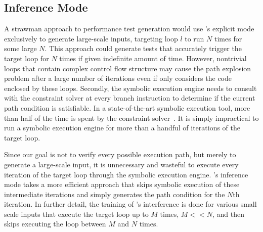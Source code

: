 \subsection{Inference Mode}
\label{sec:inference-mode}

A strawman approach to performance test generation would use \lancet's explicit mode exclusively to generate large-scale inputs, targeting loop $l$ to run $N$ times for some large $N$. This approach could generate tests that accurately trigger the target loop for $N$ times if given indefinite amount of time. However, nontrivial loops that contain complex control flow structure may cause the path explosion problem after a large number of iterations even if \lancet only considers the code enclosed by these loops. Secondly, the symbolic execution engine needs to consult with the constraint solver at every branch instruction to determine if the current path condition is satisfiable. In a state-of-the-art symbolic execution tool, more than half of the time is spent by the constraint solver~\cite{klee}. It is simply impractical to run a symbolic execution engine for more than a handful of iterations of the target loop.

Since our goal is not to verify every possible execution path, but merely to generate a large-scale input, it is unnecessary and wasteful to execute every iteration of the target loop through the symbolic execution engine. \lancet's inference mode takes a more efficient approach that skips symbolic execution of these intermediate iterations and simply generates the path condition for the $N$th iteration. In further detail, the training of \lancet's interference is done for various small scale inputs that execute the target loop up to $M$ times, $M << N$, and then skips executing the loop between $M$ and $N$ times.  

